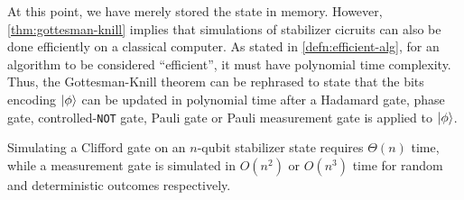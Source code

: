 At this point, we have merely stored the state in memory. However,
\cref{thm:gottesman-knill} implies that simulations of stabilizer cicruits can
also be done efficiently on a classical computer. As stated in
\cref{defn:efficient-alg}, for an algorithm to be
considered \enquote{efficient}, it must have polynomial time complexity.
Thus, the Gottesman-Knill theorem can be rephrased to state that the bits encoding
$\ket{\phi}$ can be updated in polynomial time after a Hadamard gate, phase
gate, controlled-\verb|NOT| gate, Pauli gate or Pauli measurement gate is
applied to $\ket{\phi}$.
\begin{thm}\label{thm:sim-stab-comp}
  Simulating a Clifford gate on an $n$-qubit stabilizer state requires $\Theta(n)$
  time, while a measurement gate is simulated in $O(n^2)$ or $O(n^3)$ time for
  random and deterministic outcomes respectively.
\end{thm}
